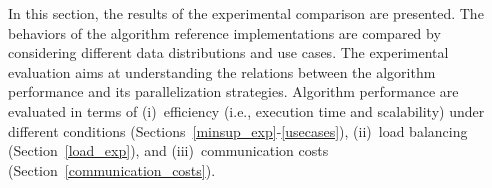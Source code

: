 \documentclass[preprint,review,12pt]{elsarticle}
\begin{document}

In this section, the results of the experimental comparison are presented.
The behaviors of the algorithm reference implementations are compared
by considering different data distributions and use cases. 
The experimental evaluation aims at understanding the relations between 
the algorithm performance 
and its parallelization strategies. 
Algorithm performance are evaluated in terms of
(i)~efficiency (i.e., execution time and scalability) under different conditions
(Sections~\ref{minsup_exp}-\ref{usecases}),
(ii)~load balancing (Section~\ref{load_exp}), and
(iii)~communication costs (Section~\ref{communication_costs}).

\end{document}
